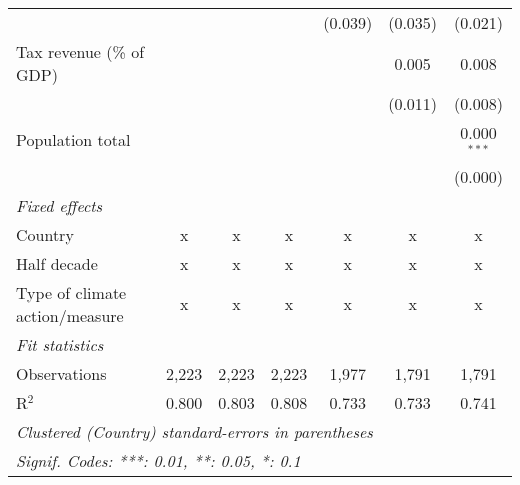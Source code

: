 \begin{tabular}{lcccccc}
                                                      &         &               &                & (0.039)        & (0.035)        & (0.021)\\   
   Tax revenue (\% of GDP)                            &         &               &                &                & 0.005          & 0.008\\   
                                                      &         &               &                &                & (0.011)        & (0.008)\\   
   Population total                                   &         &               &                &                &                & 0.000$^{***}$\\   
                                                      &         &               &                &                &                & (0.000)\\   
   \emph{Fixed effects}\\
   Country                                            & x       & x             & x              & x              & x              & x\\  
   Half decade                                        & x       & x             & x              & x              & x              & x\\  
   Type of climate action/measure                     & x       & x             & x              & x              & x              & x\\  
   \midrule \emph{Fit statistics}\\
   Observations                                       & 2,223   & 2,223         & 2,223          & 1,977          & 1,791          & 1,791\\  
   R$^2$                                              & 0.800   & 0.803         & 0.808          & 0.733          & 0.733          & 0.741\\  
   \midrule
   \multicolumn{7}{l}{\emph{Clustered (Country) standard-errors in parentheses}}\\
   \multicolumn{7}{l}{\emph{Signif. Codes: ***: 0.01, **: 0.05, *: 0.1}}\\
\end{tabular}
\par\endgroup



